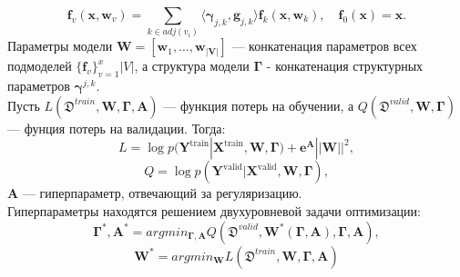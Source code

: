 \documentclass[12pt, twoside]{article}
\begin{document}
	 $$\textbf{f}_{v}(\textbf{x}, \textbf{w}_{v}) = \sum\limits_{k \in adj(v_i)} \langle \boldsymbol{\gamma}_{j, k}, \textbf{g}_{j, k} \rangle \textbf{f}_{k}(\textbf{x}, \textbf{w}_{k}), \quad \textbf{f}_{0}(\textbf{x}) = \textbf{x}.$$ 
	Параметры модели $\mathbf{W}=[\mathbf{w}_1,\dots,\mathbf{w}_\mathbf{|V|}]$ --- конкатенация параметров всех подмоделей $\{\textbf{f}_{v}\}_{v = 1}^x{|V|}$, а
	структура модели $\boldsymbol{\Gamma}$ - конкатенация структурных параметров $\boldsymbol{\gamma}^{j,k}$. \\
Пусть $L(\mathfrak{D}^{train},\mathbf{W},\boldsymbol{\Gamma}, \textbf{A})$ --- функция потерь на обучении, а $Q(\mathfrak{D}^{valid},\mathbf{W},\boldsymbol{\Gamma})$ --- фунция потерь на валидации. Тогда:
$$L =  \log p(\mathbf{Y}^\text{train}|\mathbf{X}^\text{train}, \mathbf{W}, \boldsymbol{\Gamma}) + \boldsymbol{e}^{\mathbf{A}}||\mathbf{W}||^2,$$
$$Q =\log p(\mathbf{Y}^\text{valid}|\mathbf{X}^\text{valid}, \mathbf{W}, \boldsymbol{\Gamma}),
$$
$\mathbf{A}$ --- гиперпараметр, отвечающий за регуляризацию. \\
Гиперпараметры находятся решением двухуровневой задачи оптимизации:
$$\boldsymbol{\Gamma^{*}},\mathbf{A^{*}} = argmin_{\boldsymbol{\Gamma},\mathbf{A}} Q(\mathfrak{D}^{valid},\mathbf{W^*(\boldsymbol{\Gamma},\mathbf{A})},\boldsymbol{\Gamma},\mathbf{A}),$$
$$\mathbf{W^*} = argmin_\mathbf{W} L(\mathfrak{D}^{train},\mathbf{W},\boldsymbol{\Gamma},\mathbf{A})$$
\end{document}
